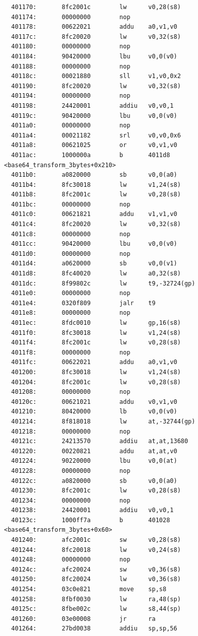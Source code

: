 \documentclass[11pt]{article}
\begin{document}
\begin{verbatim}
  401170:       8fc2001c        lw      v0,28(s8)
  401174:       00000000        nop
  401178:       00622021        addu    a0,v1,v0
  40117c:       8fc20020        lw      v0,32(s8)
  401180:       00000000        nop
  401184:       90420000        lbu     v0,0(v0)
  401188:       00000000        nop
  40118c:       00021880        sll     v1,v0,0x2
  401190:       8fc20020        lw      v0,32(s8)
  401194:       00000000        nop
  401198:       24420001        addiu   v0,v0,1
  40119c:       90420000        lbu     v0,0(v0)
  4011a0:       00000000        nop
  4011a4:       00021182        srl     v0,v0,0x6
  4011a8:       00621025        or      v0,v1,v0
  4011ac:       1000000a        b       4011d8 <base64_transform_3bytes+0x210>
  4011b0:       a0820000        sb      v0,0(a0)
  4011b4:       8fc30018        lw      v1,24(s8)
  4011b8:       8fc2001c        lw      v0,28(s8)
  4011bc:       00000000        nop
  4011c0:       00621821        addu    v1,v1,v0
  4011c4:       8fc20020        lw      v0,32(s8)
  4011c8:       00000000        nop
  4011cc:       90420000        lbu     v0,0(v0)
  4011d0:       00000000        nop
  4011d4:       a0620000        sb      v0,0(v1)
  4011d8:       8fc40020        lw      a0,32(s8)
  4011dc:       8f99802c        lw      t9,-32724(gp)
  4011e0:       00000000        nop
  4011e4:       0320f809        jalr    t9
  4011e8:       00000000        nop
  4011ec:       8fdc0010        lw      gp,16(s8)
  4011f0:       8fc30018        lw      v1,24(s8)
  4011f4:       8fc2001c        lw      v0,28(s8)
  4011f8:       00000000        nop
  4011fc:       00622021        addu    a0,v1,v0
  401200:       8fc30018        lw      v1,24(s8)
  401204:       8fc2001c        lw      v0,28(s8)
  401208:       00000000        nop
  40120c:       00621021        addu    v0,v1,v0
  401210:       80420000        lb      v0,0(v0)
  401214:       8f818018        lw      at,-32744(gp)
  401218:       00000000        nop
  40121c:       24213570        addiu   at,at,13680
  401220:       00220821        addu    at,at,v0
  401224:       90220000        lbu     v0,0(at)
  401228:       00000000        nop
  40122c:       a0820000        sb      v0,0(a0)
  401230:       8fc2001c        lw      v0,28(s8)
  401234:       00000000        nop
  401238:       24420001        addiu   v0,v0,1
  40123c:       1000ff7a        b       401028 <base64_transform_3bytes+0x60>
  401240:       afc2001c        sw      v0,28(s8)
  401244:       8fc20018        lw      v0,24(s8)
  401248:       00000000        nop
  40124c:       afc20024        sw      v0,36(s8)
  401250:       8fc20024        lw      v0,36(s8)
  401254:       03c0e821        move    sp,s8
  401258:       8fbf0030        lw      ra,48(sp)
  40125c:       8fbe002c        lw      s8,44(sp)
  401260:       03e00008        jr      ra
  401264:       27bd0038        addiu   sp,sp,56


\end{verbatim}
\end{document}
